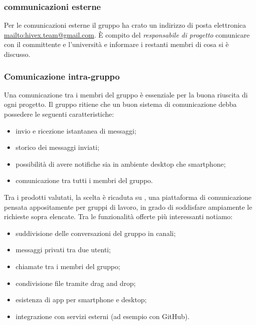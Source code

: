 		\subsubsection{communicazioni esterne}
			Per le comunicazioni esterne il gruppo ha crato un indirizzo di posta elettronica \url{mailto:hivex.team@gmail.com}.
			È compito del \textit{responsabile di progetto} comunicare con il committente e l'università e informare i restanti membri di cosa si è discusso. %

\subsubsection{Comunicazione intra-gruppo} 
Una comunicazione tra i membri del gruppo è essenziale per la buona riuscita di ogni progetto. Il gruppo ritiene che un buon sistema di comunicazione debba possedere le seguenti caratteristiche:
\begin{itemize}
	\item invio e ricezione istantanea di messaggi;
	\item storico dei messaggi inviati;
	\item possibilità di avere notifiche  sia in ambiente desktop che smartphone;
	\item comunicazione tra tutti i membri del gruppo.
\end{itemize}
Tra i prodotti valutati, la scelta è ricaduta su , una piattaforma di comunicazione pensata appositamente per gruppi di lavoro, in grado di soddisfare ampiamente le richieste sopra elencate. Tra le funzionalità offerte più interessanti notiamo:
\begin{itemize}
	\item suddivisione delle conversazioni del gruppo in canali;
	\item messaggi privati tra due utenti;
	\item chiamate tra i membri del gruppo; 
	\item condivisione file tramite drag and drop;
	\item esistenza di app per smartphone e desktop;
	\item integrazione con servizi esterni (ad esempio con GitHub).
\end{itemize}
